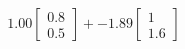\documentclass[preview]{standalone}
\begin{document}
\begin{align*}
1.00 \begin{bmatrix} 0.8 \\ 0.5 \end{bmatrix} + -1.89 \begin{bmatrix} 1 \\ 1.6 \end{bmatrix}
\end{align*}
\end{document}
